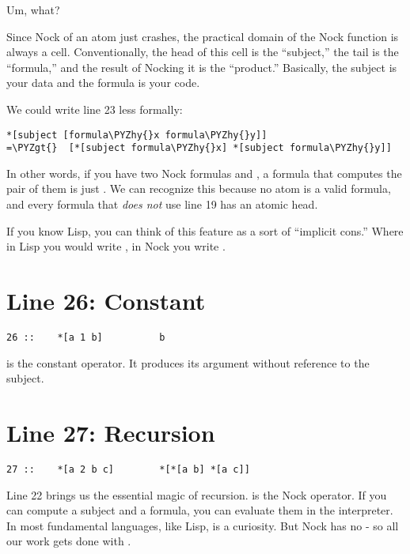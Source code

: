 Um, what?

Since Nock of an atom just crashes, the practical domain of the Nock function
is always a cell.  Conventionally, the head of this cell is the ``subject,'' the
tail is the ``formula,'' and the result of Nocking it is the ``product.''
Basically, the subject is your data and the formula is your code.

We could write line 23 less formally:

\begin{framed_shaded}
\begin{Verbatim}[fontsize=\relsize{-2.5},fontseries=b,commandchars=\\\{\}]
*[subject [formula\PYZhy{}x formula\PYZhy{}y]]
=\PYZgt{}  [*[subject formula\PYZhy{}x] *[subject formula\PYZhy{}y]]
\end{Verbatim}
\end{framed_shaded}
In other words, if you have two Nock formulas  and , a formula that
computes the pair of them is just \kode{[x y]}.  We can recognize this because no
atom is a valid formula, and every formula that \emph{does not} use line 19 has an
atomic head.

If you know Lisp, you can think of this feature as a sort of ``implicit cons.''
Where in Lisp you would write , in Nock you write \kode{[x y]}.

\section{Line 26: Constant}

\begin{framed_shaded}
\begin{Verbatim}[fontsize=\relsize{-2.5},fontseries=b,commandchars=\\\{\}]
26 ::    *[a 1 b]          b
\end{Verbatim}
\end{framed_shaded}
 is the constant operator.  It produces its argument without
reference to the subject. 

\section{Line 27: Recursion}

\begin{framed_shaded}
\begin{Verbatim}[fontsize=\relsize{-2.5},fontseries=b,commandchars=\\\{\}]
27 ::    *[a 2 b c]        *[*[a b] *[a c]]
\end{Verbatim}
\end{framed_shaded}
Line 22 brings us the essential magic of recursion.   is the Nock operator.
If you can compute a subject and a formula, you can evaluate them in the
interpreter.  In most fundamental languages, like Lisp,  is a curiosity.
But Nock has no  - so all our work gets done with .

